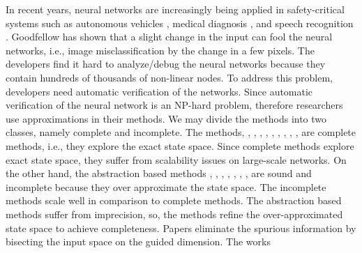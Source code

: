 










In recent years, neural networks are increasingly being applied in
safety-critical systems such as autonomous vehicles \cite{bojarski2016end},
medical diagnosis \cite{amato2013artificial}, and speech recognition \cite{hinton2012deep}.
Goodfellow \cite{goodfellow2014explaining} has shown that a slight change in the input can fool the neural networks,
i.e., image misclassification by the change in a few pixels.
The developers find it hard to analyze/debug the neural networks because they contain hundreds of thousands of non-linear nodes.
To address this problem, developers need automatic verification of the networks.
Since automatic verification of the neural network is an NP-hard problem, therefore researchers use approximations in their methods.
We may divide the methods into two classes, namely complete and incomplete.
The methods\cite{lomuscio2017approach}, \cite{fischetti2018deep},
\cite{dutta2018output}, \cite{cheng2017maximum}, \cite{katz2017reluplex}, \cite{katz2019marabou}, 
\cite{ehlers2017formal}, \cite{huang2017safety}, \cite{wang2021beta}, \cite{xu2020fast}, \cite{zhang2022general}
are complete methods, i.e., they explore the exact state space.
Since complete methods explore exact state space, they suffer from scalability issues on large-scale networks.
On the other hand, the abstraction based methods
\cite{dvijotham2018dual}, \cite{gehr2018ai2}, \cite{singh2018fast},
 \cite{singh2018boosting}, \cite{weng2018towards}, \cite{wong2018provable}, \cite{zhang2018efficient}, \cite{zhang2018efficient}
are sound and incomplete because they over approximate the state space.
The incomplete methods scale well in comparison to complete methods. 
The abstraction based methods suffer from imprecision, so, the methods
\cite{wang2018formal,wang2018efficient,elboher2020abstraction,yang2021improving,lin2020art}
refine the over-approximated state space to achieve completeness. 
Papers \cite{wang2018formal,wang2018efficient,lin2020art} eliminate the
spurious information by bisecting the input space on the guided dimension. The \cite{yang2021improving} works
